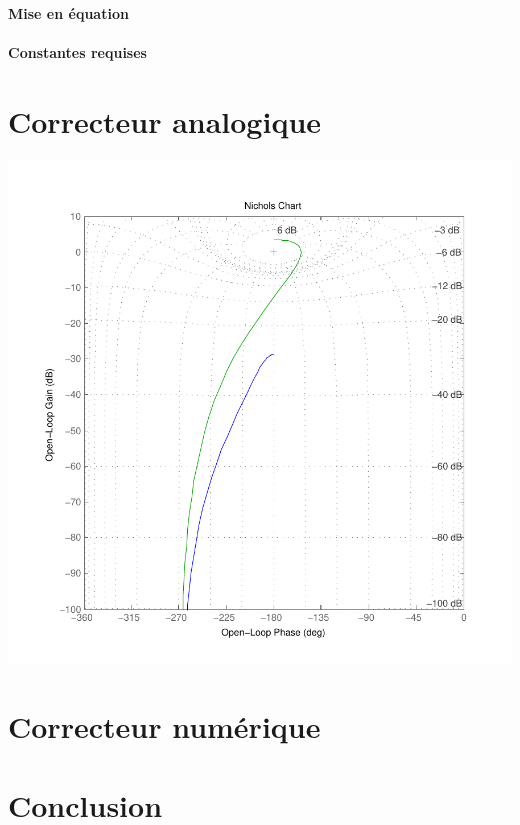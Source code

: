 \documentclass[11pt, french]{article} %
\begin{document}
\paragraph{Mise en équation}

\paragraph{Constantes requises}

\section{Correcteur analogique}


\includegraphics{MatBlack.pdf}
\section{Correcteur numérique}
\section{Conclusion}
\end{document}
